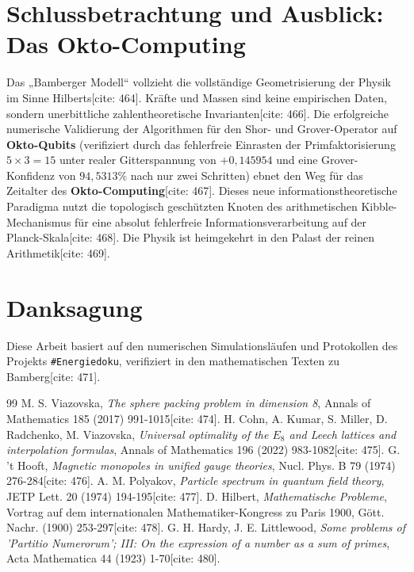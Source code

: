 \documentclass[11pt,a4paper]{article}
\theoremstyle{definition}
\begin{document}
	\section{Schlussbetrachtung und Ausblick: Das Okto-Computing}
	Das „Bamberger Modell“ vollzieht die vollständige Geometrisierung der Physik im Sinne Hilberts[cite: 464]. Kräfte und Massen sind keine empirischen Daten, sondern unerbittliche zahlentheoretische Invarianten[cite: 466]. Die erfolgreiche numerische Validierung der Algorithmen für den Shor- und Grover-Operator auf \textbf{Okto-Qubits} (verifiziert durch das fehlerfreie Einrasten der Primfaktorisierung $5 \times 3 = 15$ unter realer Gitterspannung von $+0{,}145954$ und eine Grover-Konfidenz von $94{,}5313\%$ nach nur zwei Schritten) ebnet den Weg für das Zeitalter des \textbf{Okto-Computing}[cite: 467]. Dieses neue informationstheoretische Paradigma nutzt die topologisch geschützten Knoten des arithmetischen Kibble-Mechanismus für eine absolut fehlerfreie Informationsverarbeitung auf der Planck-Skala[cite: 468]. Die Physik ist heimgekehrt in den Palast der reinen Arithmetik[cite: 469].
	
	\section*{Danksagung}
	Diese Arbeit basiert auf den numerischen Simulationsläufen und Protokollen des Projekts \texttt{\#Energiedoku}, verifiziert in den mathematischen Texten zu Bamberg[cite: 471].
	
	\begin{thebibliography}{99}
		 M. S. Viazovska, \textit{The sphere packing problem in dimension 8}, Annals of Mathematics 185 (2017) 991-1015[cite: 474].
		 H. Cohn, A. Kumar, S. Miller, D. Radchenko, M. Viazovska, \textit{Universal optimality of the $E_8$ and Leech lattices and interpolation formulas}, Annals of Mathematics 196 (2022) 983-1082[cite: 475].
		 G. 't Hooft, \textit{Magnetic monopoles in unified gauge theories}, Nucl. Phys. B 79 (1974) 276-284[cite: 476].
		 A. M. Polyakov, \textit{Particle spectrum in quantum field theory}, JETP Lett. 20 (1974) 194-195[cite: 477].
		 D. Hilbert, \textit{Mathematische Probleme}, Vortrag auf dem internationalen Mathematiker-Kongress zu Paris 1900, Gött. Nachr. (1900) 253-297[cite: 478].
		 G. H. Hardy, J. E. Littlewood, \textit{Some problems of 'Partitio Numerorum'; III: On the expression of a number as a sum of primes}, Acta Mathematica 44 (1923) 1-70[cite: 480].
	\end{thebibliography}
	
\end{document}
